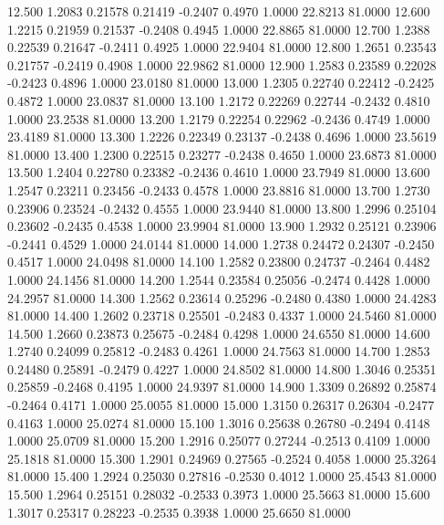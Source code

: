   12.500   1.2083   0.21578   0.21419  -0.2407   0.4970   1.0000  22.8213  81.0000
  12.600   1.2215   0.21959   0.21537  -0.2408   0.4945   1.0000  22.8865  81.0000
  12.700   1.2388   0.22539   0.21647  -0.2411   0.4925   1.0000  22.9404  81.0000
  12.800   1.2651   0.23543   0.21757  -0.2419   0.4908   1.0000  22.9862  81.0000
  12.900   1.2583   0.23589   0.22028  -0.2423   0.4896   1.0000  23.0180  81.0000
  13.000   1.2305   0.22740   0.22412  -0.2425   0.4872   1.0000  23.0837  81.0000
  13.100   1.2172   0.22269   0.22744  -0.2432   0.4810   1.0000  23.2538  81.0000
  13.200   1.2179   0.22254   0.22962  -0.2436   0.4749   1.0000  23.4189  81.0000
  13.300   1.2226   0.22349   0.23137  -0.2438   0.4696   1.0000  23.5619  81.0000
  13.400   1.2300   0.22515   0.23277  -0.2438   0.4650   1.0000  23.6873  81.0000
  13.500   1.2404   0.22780   0.23382  -0.2436   0.4610   1.0000  23.7949  81.0000
  13.600   1.2547   0.23211   0.23456  -0.2433   0.4578   1.0000  23.8816  81.0000
  13.700   1.2730   0.23906   0.23524  -0.2432   0.4555   1.0000  23.9440  81.0000
  13.800   1.2996   0.25104   0.23602  -0.2435   0.4538   1.0000  23.9904  81.0000
  13.900   1.2932   0.25121   0.23906  -0.2441   0.4529   1.0000  24.0144  81.0000
  14.000   1.2738   0.24472   0.24307  -0.2450   0.4517   1.0000  24.0498  81.0000
  14.100   1.2582   0.23800   0.24737  -0.2464   0.4482   1.0000  24.1456  81.0000
  14.200   1.2544   0.23584   0.25056  -0.2474   0.4428   1.0000  24.2957  81.0000
  14.300   1.2562   0.23614   0.25296  -0.2480   0.4380   1.0000  24.4283  81.0000
  14.400   1.2602   0.23718   0.25501  -0.2483   0.4337   1.0000  24.5460  81.0000
  14.500   1.2660   0.23873   0.25675  -0.2484   0.4298   1.0000  24.6550  81.0000
  14.600   1.2740   0.24099   0.25812  -0.2483   0.4261   1.0000  24.7563  81.0000
  14.700   1.2853   0.24480   0.25891  -0.2479   0.4227   1.0000  24.8502  81.0000
  14.800   1.3046   0.25351   0.25859  -0.2468   0.4195   1.0000  24.9397  81.0000
  14.900   1.3309   0.26892   0.25874  -0.2464   0.4171   1.0000  25.0055  81.0000
  15.000   1.3150   0.26317   0.26304  -0.2477   0.4163   1.0000  25.0274  81.0000
  15.100   1.3016   0.25638   0.26780  -0.2494   0.4148   1.0000  25.0709  81.0000
  15.200   1.2916   0.25077   0.27244  -0.2513   0.4109   1.0000  25.1818  81.0000
  15.300   1.2901   0.24969   0.27565  -0.2524   0.4058   1.0000  25.3264  81.0000
  15.400   1.2924   0.25030   0.27816  -0.2530   0.4012   1.0000  25.4543  81.0000
  15.500   1.2964   0.25151   0.28032  -0.2533   0.3973   1.0000  25.5663  81.0000
  15.600   1.3017   0.25317   0.28223  -0.2535   0.3938   1.0000  25.6650  81.0000
